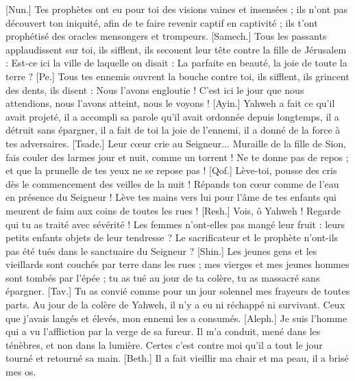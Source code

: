 \begin{multicols}{2}
[Nun.] Tes prophètes ont eu pour toi des visions vaines et insensées ; ils n’ont pas découvert ton iniquité, afin de te faire revenir captif en captivité ; ils t’ont prophétisé des oracles mensongers et trompeurs.
[Samech.] Tous les passants applaudissent sur toi, ils sifflent, ils secouent leur tête contre la fille de Jérusalem : Est-ce ici la ville de laquelle on disait : La parfaite en beauté, la joie de toute la terre ?
[Pe.] Tous tes ennemis ouvrent la bouche contre toi, ils sifflent, ils grincent des dents, ils disent : Nous l'avons engloutie ! C’est ici le jour que nous attendions, nous l’avons atteint, nous le voyons !
[Ayin.] Yahweh a fait ce qu’il avait projeté, il a accompli sa parole qu’il avait ordonnée depuis longtemps, il a détruit sans épargner, il a fait de toi la joie de l'ennemi, il a donné de la force à tes adversaires.
[Tsade.] Leur cœur crie au Seigneur... Muraille de la fille de Sion, fais couler des larmes jour et nuit, comme un torrent ! Ne te donne pas de repos ; et que la prunelle de tes yeux ne se repose pas !
[Qof.] Lève-toi, pousse des cris dès le commencement des veilles de la nuit ! Répands ton cœur comme de l’eau en présence du Seigneur ! Lève tes mains vers lui pour l'âme de tes enfants qui meurent de faim aux coins de toutes les rues !
[Resh.] Vois, ô Yahweh ! Regarde qui tu as traité avec sévérité ! Les femmes n'ont-elles pas mangé leur fruit : leurs petits enfants objets de leur tendresse ? Le sacrificateur et le prophète n’ont-ils pas été tués dans le sanctuaire du Seigneur ?
[Shin.] Les jeunes gens et les vieillards sont couchés par terre dans les rues ; mes vierges et mes jeunes hommes sont tombés par l’épée ; tu as tué au jour de ta colère, tu as massacré sans épargner.
[Tav.] Tu as convié comme pour un jour solennel mes frayeurs de toutes parts. Au jour de la colère de Yahweh, il n'y a eu ni réchappé ni survivant. Ceux que j’avais langés et élevés, mon ennemi les a consumés.
\VerseOne{}[Aleph.] Je suis l’homme qui a vu l’affliction par la verge de sa fureur.
Il m’a conduit, mené dans les ténèbres, et non dans la lumière.
Certes c'est contre moi qu'il a tout le jour tourné et retourné sa main.
[Beth.] Il a fait vieillir ma chair et ma peau, il a brisé mes os.

\end{multicols}

